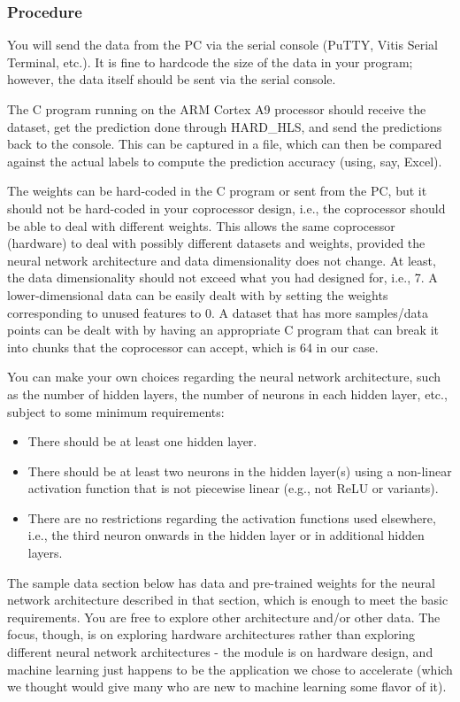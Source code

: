 \documentclass[a4paper,12pt,twoside]{article}
\begin{document}
\subsubsection{Procedure}
You will send the data from the PC via the serial console (PuTTY, Vitis Serial Terminal, etc.). It is fine to hardcode the size of the data in your program; however, the data itself should be sent via the serial console.

The C program running on the ARM Cortex A9 processor should receive the dataset, get the prediction done through HARD\_HLS, and send the predictions back to the console. This can be captured in a file, which can then be compared against the actual labels to compute the prediction accuracy (using, say, Excel).

The weights can be hard-coded in the C program or sent from the PC, but it should not be hard-coded in your coprocessor design, i.e., the coprocessor should be able to deal with different weights. This allows the same coprocessor (hardware) to deal with possibly different datasets and weights, provided the neural network architecture and data dimensionality does not change. At least, the data dimensionality should not exceed what you had designed for, i.e., 7. A lower-dimensional data can be easily dealt with by setting the weights corresponding to unused features to 0. A dataset that has more samples/data points can be dealt with by having an appropriate C program that can break it into chunks that the coprocessor can accept, which is 64 in our case.

You can make your own choices regarding the neural network architecture, such as the number of hidden layers, the number of neurons in each hidden layer, etc., subject to some minimum requirements:
\begin{itemize}
    \item There should be at least one hidden layer.
    \item There should be at least two neurons in the hidden layer(s) using a non-linear activation function that is not piecewise linear (e.g., not ReLU or variants).
    \item There are no restrictions regarding the activation functions used elsewhere, i.e., the third neuron onwards in the hidden layer or in additional hidden layers. 
\end{itemize}
The sample data section below has data and pre-trained weights for the neural network architecture described in that section, which is enough to meet the basic requirements. You are free to explore other architecture and/or other data. The focus, though, is on exploring hardware architectures rather than exploring different neural network architectures - the module is on hardware design, and machine learning just happens to be the application we chose to accelerate (which we thought would give many who are new to machine learning some flavor of it).
\end{document}
